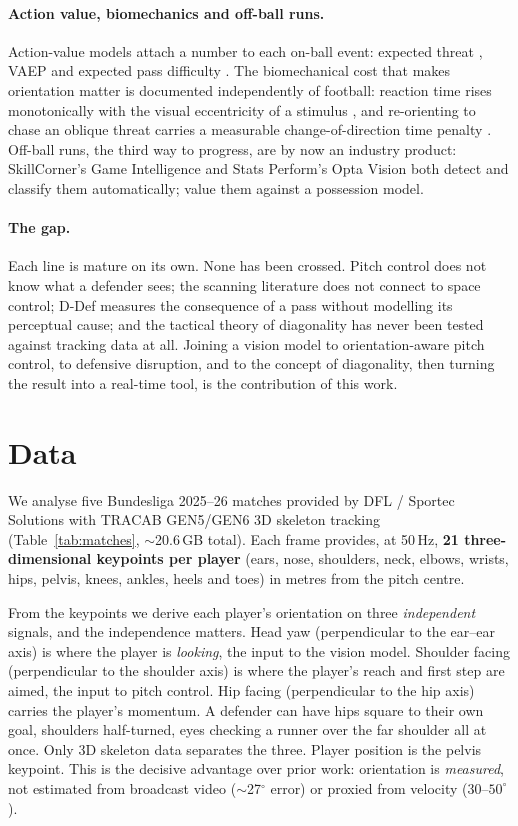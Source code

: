 \documentclass[11pt]{article}
\begin{document}
\paragraph{Action value, biomechanics and off-ball runs.} Action-value
models attach a number to each on-ball event: expected threat
\citep{singh2018}, VAEP \citep{decroos2019} and expected pass difficulty
\citep{anzer2022}. The biomechanical cost that makes orientation matter is
documented independently of football: reaction time rises monotonically
with the visual eccentricity of a stimulus \citep{vater2024}, and
re-orienting to chase an oblique threat carries a measurable
change-of-direction time penalty \citep{dossantos2018}. Off-ball runs,
the third way to progress, are by now an industry product: SkillCorner's
Game Intelligence \citep{skillcorner2024} and Stats Perform's Opta Vision
\citep{optavision2025} both detect and classify them automatically;
\citet{llana2022} value them against a possession model.

\paragraph{The gap.} Each line is mature on its own. None has been
crossed. Pitch control does not know what a defender sees; the scanning
literature does not connect to space control; D-Def measures the
consequence of a pass without modelling its perceptual cause; and the
tactical theory of diagonality has never been tested against tracking data
at all. Joining a vision model to orientation-aware pitch control, to
defensive disruption, and to the concept of diagonality, then turning the
result into a real-time tool, is the contribution of this work.

\section{Data}
\label{sec:data}

We analyse five Bundesliga 2025--26 matches provided by DFL / Sportec
Solutions with TRACAB GEN5/GEN6 3D skeleton tracking
(Table~\ref{tab:matches}, $\sim$20.6\,GB total). Each frame provides, at
50\,Hz, \textbf{21 three-dimensional keypoints per player} (ears, nose,
shoulders, neck, elbows, wrists, hips, pelvis, knees, ankles, heels and
toes) in metres from the pitch centre.

From the keypoints we derive each player's orientation on three
\emph{independent} signals, and the independence matters. Head yaw
(perpendicular to the ear--ear axis) is where the player is \emph{looking},
the input to the vision model. Shoulder facing (perpendicular to the
shoulder axis) is where the player's reach and first step are aimed, the
input to pitch control. Hip facing (perpendicular to the hip axis) carries
the player's momentum. A defender can have hips square to their own goal,
shoulders half-turned, eyes checking a runner over the far shoulder
all at once. Only 3D skeleton data separates the three. Player position is
the pelvis keypoint. This is the decisive advantage over prior work:
orientation is \emph{measured}, not estimated from broadcast video
($\sim$27$^\circ$ error) or proxied from velocity ($30$--$50^\circ$).
\end{document}
